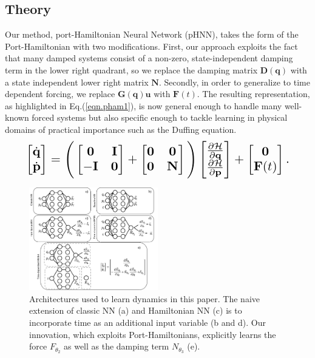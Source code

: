 \documentclass{article}
\begin{document}
\subsection{Theory}
Our method, port-Hamiltonian Neural Network (pHNN), takes the form of the Port-Hamiltonian with two modifications. First, our approach exploits the fact that many damped systems consist of a non-zero, state-independent damping term in the lower right quadrant, so we replace the damping matrix $\mathbf{D}(\mathbf{q})$ with a state independent lower right matrix $\mathbf{N}$. Secondly, in order to generalize to time dependent forcing, we replace $\mathbf{G}(\mathbf{q})\mathbf{u}$ with $\mathbf{F}(t)$. The resulting representation, as highlighted in Eq.(\ref{eqn.pham1}), is now general enough to handle many well-known forced systems but also specific enough to tackle learning in physical domains of practical importance such as the Duffing equation.
\begin{equation}
\resizebox{0.9\linewidth}{!}{$%
\begin{bmatrix}
\dot{\mathbf{q}} \\
\dot{\mathbf{p}}
\end{bmatrix}
=
\Bigg(\begin{bmatrix}
\mathbf{0} & \mathbf{I} \\
-\mathbf{I} & \mathbf{0}
\end{bmatrix} +
\begin{bmatrix}
\mathbf{0} & \mathbf{0} \\
\mathbf{0} & \mathbf{N}
\end{bmatrix}
 \Bigg)
 \begin{bmatrix}
\frac{\partial \mathcal{H}}{\partial \mathbf{q}} \\
\frac{\partial \mathcal{H}}{\partial \mathbf{p}}
\end{bmatrix}
+
\begin{bmatrix}
\mathbf{0} \\
\mathbf{F}(t)
\end{bmatrix}.
$%
}%
\label{eqn.pham1}
\end{equation}
\begin{figure}[h!]
\centering
\includegraphics[width=0.5\textwidth]{figures/architecture2.pdf}
\caption{Architectures used to learn dynamics in this paper. The naive extension of classic NN (a) and Hamiltonian NN (c) is to incorporate time as an additional input variable (b and d). Our innovation, which exploits Port-Hamiltonians, explicitly learns the force $F_{\theta_2}$ as well as the damping term $N_{\theta_3}$ (e).}
\label{fig.architecture}
\end{figure}
\end{document}
